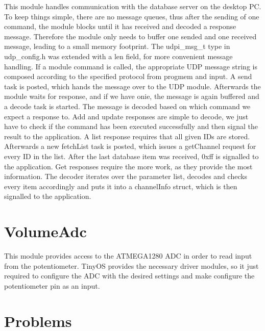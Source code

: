 \documentclass[12pt,a4paper,titlepage,oneside]{article}
\begin{document}
This module handles communication with the database server on the desktop PC.
To keep things simple, there are no message queues, thus after the sending of
one command, the module blocks until it has received and decoded a response
message. Therefore the module only needs to buffer one sended and one received
message, leading to a small memory footprint. The udpi\_msg\_t type in udp\_config.h
was extended with a len field, for more convenient message handling. If a module
command is called, the appropriate UDP message string is composed according to
the specified protocol from progmem and input. A send task is posted, which 
hands the message over to the UDP module. Afterwards the module waits for response,
and if we have onie, the message is again buffered and a decode task is started.
The message is decoded based on which command we expect a response to. Add and update
responses are simple to decode, we just have to check if the command has been 
executed successfully and then signal the result to the application. A list response
requires that all given IDs are stored. Afterwards a new fetchList task is posted,
which issues a getChannel request for every ID in the list. After the last database
item was received, 0xff is signalled to the application. Get responses require
the more work, as they provide the most information. The decoder iterates over
the parameter list, decodes and checks every item accordingly and puts it into
a channelInfo struct, which is then signalled to the application.

\section{VolumeAdc}

This module provides access to the ATMEGA1280 ADC in order to read input from
the potentiometer. TinyOS provides the necessary driver modules, so it just
required to configure the ADC with the desired settings and make configure
the potentiometer pin as an input.

\section{Problems}
\end{document}
